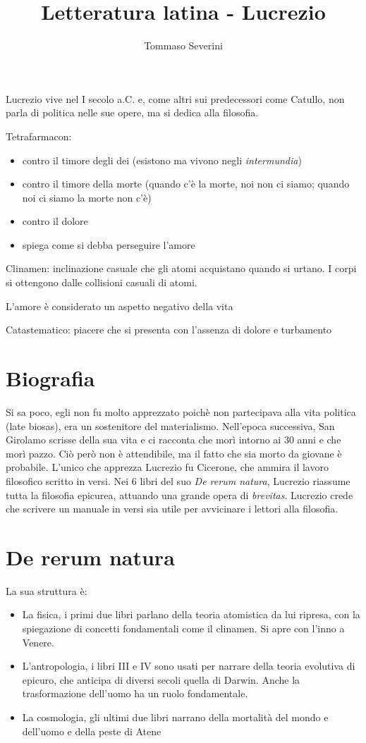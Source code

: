 \documentclass[10pt,a4paper]{article}
\author{Tommaso Severini}
\title{Letteratura latina -  Lucrezio}
\begin{document}
	\maketitle
	
	Lucrezio vive nel I secolo a.C. e, come altri sui predecessori come Catullo, non parla di politica nelle sue opere, ma si dedica alla filosofia.
	
	Tetrafarmacon:
	\begin{itemize}
		\item contro il timore degli dei (esistono ma vivono negli \textit{intermundia})
		\item contro il timore della morte (quando c'è la morte, noi non ci siamo; quando noi ci siamo la morte non c'è)
		\item contro il dolore
		\item spiega come si debba perseguire l'amore
	\end{itemize}

	Clinamen: inclinazione casuale che gli atomi acquistano quando si urtano.
	I corpi si ottengono dalle collisioni casuali di atomi.
	
	L'amore è considerato un aspetto negativo della vita
	
	Catastematico: piacere che si presenta con l'assenza di dolore e turbamento
	
	\section{Biografia}
	
	Si sa poco, egli non fu molto apprezzato poichè non partecipava alla vita politica (late biosas), era un sostenitore del materialismo. Nell'epoca successiva, San Girolamo scrisse della sua vita e ci racconta che morì intorno ai 30 anni e che morì pazzo. Ciò però non è attendibile, ma il fatto che sia morto da giovane è probabile. L'unico che apprezza Lucrezio fu Cicerone, che ammira il lavoro filosofico scritto in versi. Nei 6 libri del suo \textit{De rerum natura}, Lucrezio riassume tutta la filosofia epicurea, attuando una grande opera di \textit{brevitas}. Lucrezio crede che scrivere un manuale in versi sia utile per avvicinare i lettori alla filosofia.
	
	\section{De rerum natura}
	
	La sua struttura è:
	
	\begin{itemize}
		\item La fisica, i primi due libri parlano della teoria atomistica da lui ripresa, con la spiegazione di concetti fondamentali come il clinamen. Si apre con l'inno a Venere.
		\item L'antropologia, i libri III e IV sono usati per narrare della teoria evolutiva di epicuro, che anticipa di diversi secoli quella di Darwin. Anche la trasformazione dell'uomo ha un ruolo fondamentale. 
		\item La cosmologia, gli ultimi due libri narrano della mortalità del mondo e dell'uomo e della peste di Atene
	\end{itemize}
	
\end{document}
